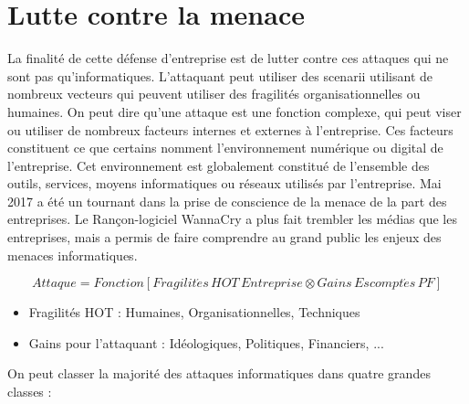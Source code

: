 \section{Lutte contre la menace}

La finalité de cette défense d’entreprise est de lutter contre ces attaques qui ne sont pas qu’informatiques. L’attaquant peut utiliser des scenarii utilisant de nombreux vecteurs qui peuvent utiliser des fragilités organisationnelles ou humaines. On peut dire qu’une attaque est une fonction complexe, qui peut viser ou utiliser de nombreux facteurs internes et externes à l’entreprise. Ces facteurs constituent ce que certains nomment l’environnement numérique ou digital de l’entreprise. Cet environnement est globalement constitué de l’ensemble des outils, services, moyens informatiques ou réseaux utilisés par l’entreprise.
Mai 2017 a été un tournant dans la prise de conscience de la menace de la part des entreprises. Le Rançon-logiciel WannaCry a plus fait trembler les médias que les entreprises, mais a permis de faire comprendre au grand public les enjeux des menaces informatiques.


\begin{nota}
\begin{equation}
Attaque = Fonction \left[ Fragilit\acute{e}s\,HOT\, Entreprise\otimes Gains\,Escompt\acute{e}s\,PF \right]
\end{equation}
\end{nota}

\begin{itemize}
	\item Fragilités HOT : Humaines, Organisationnelles, Techniques 
	\item Gains pour l'attaquant : Idéologiques, Politiques, Financiers, ...
\end{itemize}

On peut classer la majorité des attaques informatiques dans quatre grandes classes :


